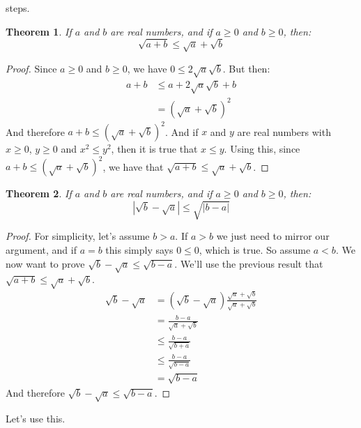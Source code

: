 \documentclass{article}
\theoremstyle{normal}
\theoremstyle{plain}
\newtheorem{theorem}{Theorem}
\begin{document}
    steps.
    \begin{theorem}
        If $a$ and $b$ are real numbers, and if $a\geq{0}$ and $b\geq{0}$,
        then:
        \begin{equation}
            \sqrt{a+b}\leq\sqrt{a}+\sqrt{b}
        \end{equation}
    \end{theorem}
    \begin{proof}
        Since $a\geq{0}$ and $b\geq{0}$, we have $0\leq2\sqrt{a}\sqrt{b}$.
        But then:
        \begin{align}
            a+b&\leq{a}+2\sqrt{a}\sqrt{b}+b\\
            &=(\sqrt{a}+\sqrt{b})^{2}
        \end{align}
        And therefore $a+b\leq(\sqrt{a}+\sqrt{b})^{2}$. And if
        $x$ and $y$ are real numbers with $x\geq{0}$, $y\geq{0}$ and
        $x^{2}\leq{y}^{2}$, then it is true that $x\leq{y}$. Using this, since
        $a+b\leq(\sqrt{a}+\sqrt{b})^{2}$, we have that
        $\sqrt{a+b}\leq\sqrt{a}+\sqrt{b}$.
    \end{proof}
    \begin{theorem}
        If $a$ and $b$ are real numbers, and if $a\geq{0}$ and $b\geq{0}$,
        then:
        \begin{equation}
            |\sqrt{b}-\sqrt{a}|
            \leq\sqrt{|b-a|}
        \end{equation}
    \end{theorem}
    \begin{proof}
        For simplicity, let's assume $b>a$. If $a>b$ we just need to
        mirror our argument, and if $a=b$ this simply says $0\leq{0}$, which is
        true. So assume $a<b$. We now want to prove
        $\sqrt{b}-\sqrt{a}\leq\sqrt{b-a}$. We'll use the previous result
        that $\sqrt{a+b}\leq\sqrt{a}+\sqrt{b}$.
        \begin{align}
            \sqrt{b}-\sqrt{a}
            &=(\sqrt{b}-\sqrt{a})\frac{\sqrt{a}+\sqrt{b}}{\sqrt{a}+\sqrt{b}}\\
            &=\frac{b-a}{\sqrt{a}+\sqrt{b}}\\
            &\leq\frac{b-a}{\sqrt{b+a}}\\
            &\leq\frac{b-a}{\sqrt{b-a}}\\
            &=\sqrt{b-a}
        \end{align}
        And therefore $\sqrt{b}-\sqrt{a}\leq\sqrt{b-a}$.
    \end{proof}
    Let's use this.
\end{document}
